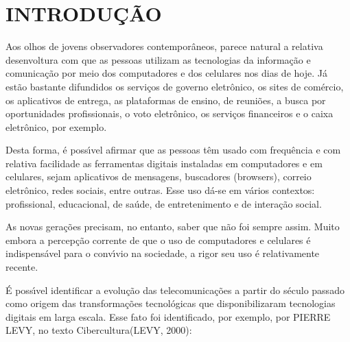 \documentclass[
12pt,		%
openright,	%
twoside,  %
a4paper,			%
chapter=TITLE,		%
english,			%
french,				%
spanish,			%
brazil				%
]{USPSC-classe/USPSC}
\begin{document}
\chapter[INTRODU\c{C}\~AO]{INTRODU\c{C}\~AO}\label{INTRODU\c{C}\~AO}
Aos olhos de jovens observadores contempor\^aneos, parece natural a relativa desenvoltura com que as pessoas utilizam  as tecnologias da informa\c{c}\~ao e comunica\c{c}\~ao por meio dos  computadores e dos celulares nos dias de hoje. J\'a est\~ao bastante difundidos os servi\c{c}os de governo eletr\^onico, os sites de com\'ercio, os  aplicativos de entrega, as plataformas de ensino, de reuni\~oes, a busca por oportunidades profissionais, o voto eletr\^onico, os servi\c{c}os financeiros e o caixa eletr\^onico, por exemplo.














Desta forma, \'e poss\'{\i}vel afirmar que as pessoas t\^em usado com frequ\^encia e com relativa facilidade as ferramentas digitais instaladas em computadores e em celulares, sejam aplicativos de mensagens, buscadores (browsers), correio eletr\^onico, redes sociais, entre outras. Esse uso d\'a-se em v\'arios contextos: profissional, educacional, de sa\'ude,  de entretenimento e de intera\c{c}\~ao social.














As novas gera\c{c}\~oes precisam, no entanto, saber que n\~ao foi sempre assim. Muito embora a percep\c{c}\~ao corrente de que o uso de computadores e celulares \'e indispens\'avel para o conv\'{\i}vio na sociedade, a rigor seu uso \'e relativamente recente.














\'E poss\'{\i}vel identificar a evolu\c{c}\~ao das telecomunica\c{c}\~oes a partir do s\'eculo passado como origem das transforma\c{c}\~oes tecnol\'ogicas que disponibilizaram tecnologias digitais em larga escala. Esse fato foi identificado, por exemplo, por PIERRE LEVY, no texto \textquotedbl Cibercultura\textquotedbl  (LEVY, 2000):
\end{document}
